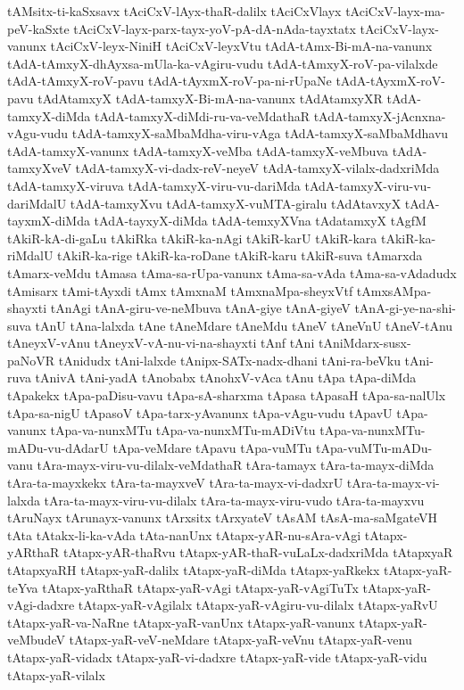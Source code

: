 {tAMsitx-ti-kaSxsavx
tAciCxV-lAyx-thaR-dalilx
tAciCxVlayx
tAciCxV-layx-ma-peV-kaSxte
tAciCxV-layx-parx-tayx-yoV-pA-dA-nAda-tayxtatx
tAciCxV-layx-vanunx
tAciCxV-leyx-NiniH
tAciCxV-leyxVtu
tAdA-tAmx-Bi-mA-na-vanunx
tAdA-tAmxyX-dhAyxsa-mUla-ka-vAgiru-vudu
tAdA-tAmxyX-roV-pa-vilalxde
tAdA-tAmxyX-roV-pavu
tAdA-tAyxmX-roV-pa-ni-rUpaNe
tAdA-tAyxmX-roV-pavu
tAdAtamxyX
tAdA-tamxyX-Bi-mA-na-vanunx
tAdAtamxyXR
tAdA-tamxyX-diMda
tAdA-tamxyX-diMdi-ru-va-veMdathaR
tAdA-tamxyX-jAcnxna-vAgu-vudu
tAdA-tamxyX-saMbaMdha-viru-vAga
tAdA-tamxyX-saMbaMdhavu
tAdA-tamxyX-vanunx
tAdA-tamxyX-veMba
tAdA-tamxyX-veMbuva
tAdA-tamxyXveV
tAdA-tamxyX-vi-dadx-reV-neyeV
tAdA-tamxyX-vilalx-dadxriMda
tAdA-tamxyX-viruva
tAdA-tamxyX-viru-vu-dariMda
tAdA-tamxyX-viru-vu-dariMdalU
tAdA-tamxyXvu
tAdA-tamxyX-vuMTA-giralu
tAdAtavxyX
tAdA-tayxmX-diMda
tAdA-tayxyX-diMda
tAdA-temxyXVna
tAdatamxyX
tAgfM
tAkiR-kA-di-gaLu
tAkiRka
tAkiR-ka-nAgi
tAkiR-karU
tAkiR-kara
tAkiR-ka-riMdalU
tAkiR-ka-rige
tAkiR-ka-roDane
tAkiR-karu
tAkiR-suva
tAmarxda
tAmarx-veMdu
tAmasa
tAma-sa-rUpa-vanunx
tAma-sa-vAda
tAma-sa-vAdadudx
tAmisarx
tAmi-tAyxdi
tAmx
tAmxnaM
tAmxnaMpa-sheyxVtf
tAmxsAMpa-shayxti
tAnAgi
tAnA-giru-ve-neMbuva
tAnA-giye
tAnA-giyeV
tAnA-gi-ye-na-shi-suva
tAnU
tAna-lalxda
tAne
tAneMdare
tAneMdu
tAneV
tAneVnU
tAneV-tAnu
tAneyxV-vAnu
tAneyxV-vA-nu-vi-na-shayxti
tAnf
tAni
tAniMdarx-susx-paNoVR
tAnidudx
tAni-lalxde
tAnipx-SATx-nadx-dhani
tAni-ra-beVku
tAni-ruva
tAnivA
tAni-yadA
tAnobabx
tAnohxV-vAca
tAnu
tApa
tApa-diMda
tApakekx
tApa-paDisu-vavu
tApa-sA-sharxma
tApasa
tApasaH
tApa-sa-nalUlx
tApa-sa-nigU
tApasoV
tApa-tarx-yAvanunx
tApa-vAgu-vudu
tApavU
tApa-vanunx
tApa-va-nunxMTu
tApa-va-nunxMTu-mADiVtu
tApa-va-nunxMTu-mADu-vu-dAdarU
tApa-veMdare
tApavu
tApa-vuMTu
tApa-vuMTu-mADu-vanu
tAra-mayx-viru-vu-dilalx-veMdathaR
tAra-tamayx
tAra-ta-mayx-diMda
tAra-ta-mayxkekx
tAra-ta-mayxveV
tAra-ta-mayx-vi-dadxrU
tAra-ta-mayx-vi-lalxda
tAra-ta-mayx-viru-vu-dilalx
tAra-ta-mayx-viru-vudo
tAra-ta-mayxvu
tAruNayx
tArunayx-vanunx
tArxsitx
tArxyateV
tAsAM
tAsA-ma-saMgateVH
tAta
tAtakx-li-ka-vAda
tAta-nanUnx
tAtapx-yAR-nu-sAra-vAgi
tAtapx-yARthaR
tAtapx-yAR-thaRvu
tAtapx-yAR-thaR-vuLaLx-dadxriMda
tAtapxyaR
tAtapxyaRH
tAtapx-yaR-dalilx
tAtapx-yaR-diMda
tAtapx-yaRkekx
tAtapx-yaR-teYva
tAtapx-yaRthaR
tAtapx-yaR-vAgi
tAtapx-yaR-vAgiTuTx
tAtapx-yaR-vAgi-dadxre
tAtapx-yaR-vAgilalx
tAtapx-yaR-vAgiru-vu-dilalx
tAtapx-yaRvU
tAtapx-yaR-va-NaRne
tAtapx-yaR-vanUnx
tAtapx-yaR-vanunx
tAtapx-yaR-veMbudeV
tAtapx-yaR-veV-neMdare
tAtapx-yaR-veVnu
tAtapx-yaR-venu
tAtapx-yaR-vidadx
tAtapx-yaR-vi-dadxre
tAtapx-yaR-vide
tAtapx-yaR-vidu
tAtapx-yaR-vilalx
}
